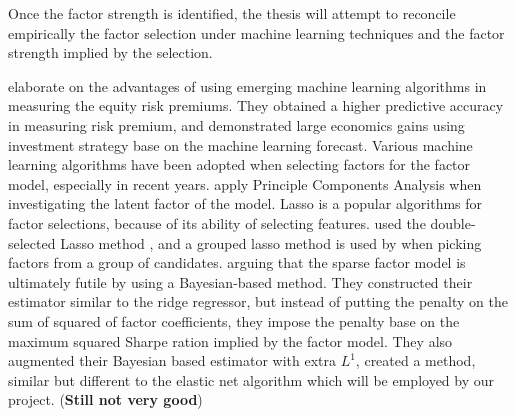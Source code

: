 Once the factor strength is identified, the thesis will attempt to reconcile empirically the factor selection under machine learning techniques and the factor strength implied by the selection.

 elaborate on the advantages of using emerging machine learning algorithms in measuring the equity risk premiums.
They obtained a higher predictive accuracy in measuring risk premium, and demonstrated large economics gains using investment strategy base on the machine learning forecast.
Various machine learning algorithms have been adopted when selecting factors for the factor model, especially in recent years.
 apply Principle Components Analysis when investigating the latent factor of the model. 
Lasso is a popular algorithms for factor selections, because of its ability of selecting features.
 used the double-selected Lasso method \cite{Belloni2014}, and a grouped lasso method \cite{Huang2010} is used by  when picking factors from a group of candidates. 
 arguing that the sparse factor model is ultimately futile by using a Bayesian-based method. 
They constructed their estimator similar to the ridge regressor, but instead of putting the penalty on the sum of squared of factor coefficients, they impose the penalty base on the maximum squared Sharpe ration implied by the factor model.
They also augmented their Bayesian based estimator with extra $L^1$, created a method,  similar but different to the elastic net algorithm which will be employed by our project. (\textbf{Still not very good})
